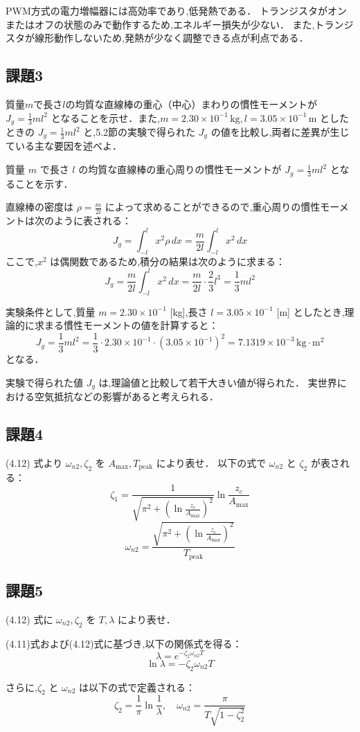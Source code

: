 PWM方式の電力増幅器には高効率であり,低発熱である．
トランジスタがオンまたはオフの状態のみで動作するため,エネルギー損失が少ない．
また,トランジスタが線形動作しないため,発熱が少なく調整できる点が利点である．


\subsection*{課題3}
質量$m$で長さ$l$の均質な直線棒の重心（中心）まわりの慣性モーメントが $J_g = \frac{1}{3}ml^2$ となることを示せ．また,$m = 2.30 \times 10^{-1} \, \mathrm{kg}, l = 3.05 \times 10^{-1} \, \mathrm{m}$ としたときの $J_g = \frac{1}{3}ml^2$ と,5.2節の実験で得られた $J_g$ の値を比較し,両者に差異が生じている主な要因を述べよ．


質量 \(m\) で長さ \(l\) の均質な直線棒の重心周りの慣性モーメントが \(J_g = \frac{1}{3}ml^2\) となることを示す．

直線棒の密度は \(\rho = \frac{m}{2l}\) によって求めることができるので,重心周りの慣性モーメントは次のように表される：
\[
  J_g = \int_{-l}^{l} x^2 \rho \, dx = \frac{m}{2l} \int_{-l}^{l} x^2 \, dx
\]
ここで,\(x^2\) は偶関数であるため,積分の結果は次のように求まる：
\[
  J_g = \frac{m}{2l} \int_{-l}^{l} x^2 \, dx = \frac{m}{2l} \cdot \frac{2}{3} l^3 = \frac{1}{3} ml^2
\]

実験条件として,質量 \(m = 2.30 \times 10^{-1}\) [kg],長さ \(l = 3.05 \times 10^{-1}\) [m] としたとき,理論的に求まる慣性モーメントの値を計算すると：
\[
  J_g = \frac{1}{3}ml^2 = \frac{1}{3} \cdot 2.30 \times 10^{-1} \cdot (3.05 \times 10^{-1})^2 = 7.1319 \times 10^{-3} \, \text{kg} \cdot \text{m}^2
\]
となる．

実験で得られた値 \(J_g\) は,理論値と比較して若干大きい値が得られた．
実世界における空気抵抗などの影響があると考えられる．

\subsection*{課題4}
(4.12) 式より $\omega_{n2}, \zeta_2$ を $A_{\max}, T_{\text{peak}}$ により表せ．
以下の式で $\omega_{n2}$ と $\zeta_2$ が表される：
\[
  \zeta_1 = \frac{1}{\sqrt{\pi^2 + \left( \ln \frac{z_c}{A_{\max}} \right)^2}} \ln \frac{z_c}{A_{\max}}
\]
\[
  \omega_{n2} = \frac{\sqrt{\pi^2 + \left( \ln \frac{z_c}{A_{\max}} \right)^2}}{T_{\text{peak}}}
\]

\subsection*{課題5}
(4.12) 式に $\omega_{n2}, \zeta_2$ を $T, \lambda$ により表せ．

(4.11)式および(4.12)式に基づき,以下の関係式を得る：
\[
  \lambda = e^{-\zeta_2 \omega_{n2} T}
\]
\[
  \ln \lambda = -\zeta_2 \omega_{n2} T
\]

さらに,$\zeta_2$ と $\omega_{n2}$ は以下の式で定義される：
\[
  \zeta_2 = \frac{1}{\pi} \ln \frac{1}{\lambda}, \quad \omega_{n2} = \frac{\pi}{T \sqrt{1 - \zeta_2^2}}
\]
